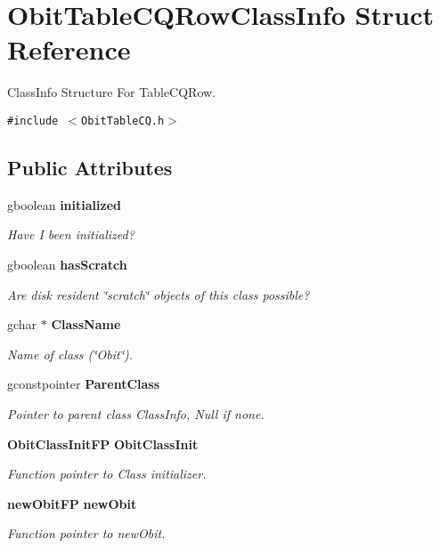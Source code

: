 \section{Obit\-Table\-CQRow\-Class\-Info Struct Reference}
\label{structObitTableCQRowClassInfo}
Class\-Info Structure For Table\-CQRow.  


{\tt \#include $<$Obit\-Table\-CQ.h$>$}

\subsection*{Public Attributes}
\begin{CompactItemize}
\item 
gboolean {\bf initialized}
\begin{CompactList}\small\item\em Have I been initialized? \item\end{CompactList}\item 
gboolean {\bf has\-Scratch}
\begin{CompactList}\small\item\em Are disk resident \char`\"{}scratch\char`\"{} objects of this class possible? \item\end{CompactList}\item 
gchar $\ast$ {\bf Class\-Name}
\begin{CompactList}\small\item\em Name of class (\char`\"{}Obit\char`\"{}). \item\end{CompactList}\item 
gconstpointer {\bf Parent\-Class}
\begin{CompactList}\small\item\em Pointer to parent class Class\-Info, Null if none. \item\end{CompactList}\item 
{\bf Obit\-Class\-Init\-FP} {\bf Obit\-Class\-Init}
\begin{CompactList}\small\item\em Function pointer to Class initializer. \item\end{CompactList}\item 
{\bf new\-Obit\-FP} {\bf new\-Obit}
\begin{CompactList}\small\item\em Function pointer to new\-Obit. \item\end{CompactList}\item 

\end{CompactItemize}
